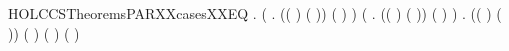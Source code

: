 \newcommand{\HOLCCSTheoremsPARXXcases}{\UseVerbatim{HOLCCSTheoremsPARXXcases}}
\begin{SaveVerbatim}{HOLCCSTheoremsPARXXcasesXXEQ}
\HOLTokenTurnstile{} \HOLSymConst{\HOLTokenForall{}}   .
        \HOLSymConst{\ensuremath{\parallel}}  \HOLTokenTransBegin{}\HOLTokenTransEnd {} \HOLSymConst{\HOLTokenEquiv{}}
       (\HOLSymConst{\HOLTokenExists{}}  .
            (( \HOLSymConst{=} ) \HOLSymConst{\HOLTokenConj{}} ( \HOLSymConst{=} )) \HOLSymConst{\HOLTokenConj{}} ( \HOLSymConst{=}  \HOLSymConst{\ensuremath{\parallel}} ) \HOLSymConst{\HOLTokenConj{}}  \HOLTokenTransBegin{}\HOLTokenTransEnd {}) \HOLSymConst{\HOLTokenDisj{}}
       (\HOLSymConst{\HOLTokenExists{}}  .
            (( \HOLSymConst{=} ) \HOLSymConst{\HOLTokenConj{}} ( \HOLSymConst{=} )) \HOLSymConst{\HOLTokenConj{}} ( \HOLSymConst{=}  \HOLSymConst{\ensuremath{\parallel}} ) \HOLSymConst{\HOLTokenConj{}}  \HOLTokenTransBegin{}\HOLTokenTransEnd {}) \HOLSymConst{\HOLTokenDisj{}}
       \HOLSymConst{\HOLTokenExists{}}    .
           (( \HOLSymConst{=} ) \HOLSymConst{\HOLTokenConj{}} ( \HOLSymConst{=} )) \HOLSymConst{\HOLTokenConj{}} ( \HOLSymConst{=} \HOLConst{\ensuremath{\tau}}) \HOLSymConst{\HOLTokenConj{}} ( \HOLSymConst{=}  \HOLSymConst{\ensuremath{\parallel}} ) \HOLSymConst{\HOLTokenConj{}}
            \HOLTokenTransBegin{} \HOLTokenTransEnd {} \HOLSymConst{\HOLTokenConj{}}  \HOLTokenTransBegin{} ( )\HOLTokenTransEnd {}
\end{SaveVerbatim}
